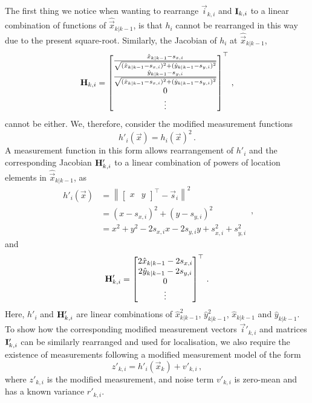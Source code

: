 \documentclass[10pt,letterpaper,oneside,twocolumn,journal]{IEEEtran}
\theoremstyle{definition}
\theoremstyle{definition}
\theoremstyle{remark}
\begin{document}
The first thing we notice when wanting to rearrange $\vec{i}_{k,i}$ and ${{\mathbf{I}}}_{k,i}$ to a linear combination of functions of $\hat{\vec{x}}_{k|k-1}$, is that $h_i$ cannot be rearranged in this way due to the present square-root. Similarly, the Jacobian of $h_i$ at $\hat{\vec{x}}_{k|k-1}$,
\begin{equation}
    {\ensuremath{{\mathbf{H}}}}_{k,i} = 
    \begin{bmatrix}
        \frac{\hat{x}_{k|k-1} - s_{x,i}}{\sqrt{(\hat{x}_{k|k-1} - s_{x,i})^2 + (\hat{y}_{k|k-1} - s_{y,i})^2}} \\
        \frac{\hat{y}_{k|k-1} - s_{y,i}}{\sqrt{(\hat{x}_{k|k-1} - s_{x,i})^2 + (\hat{y}_{k|k-1} - s_{y,i})^2}} \\
        0 \\
        \vdots
    \end{bmatrix}^\top\,,
\end{equation}
cannot be either. We, therefore, consider the modified measurement functions
\begin{equation}
    h'_i(\vec{x}) = h_i(\vec{x})^2\,. \label{eqn:modified_measurement_func}
\end{equation}
A measurement function in this form allows rearrangement of $h'_i$ and the corresponding Jacobian ${{\mathbf{H}}}'_{k,i}$ to a linear combination of powers of location elements in $\hat{\vec{x}}_{k|k-1}$, as
\begin{equation}
    \begin{split}
        h'_i(\vec{x}) &= \left\lVert
        \begin{bmatrix}
            x & y
        \end{bmatrix}^\top - \vec{s}_i\right\rVert^2 \\
        &= (x - s_{x,i})^2 + (y - s_{y,i})^2 \\
        &= x^2 + y^2 -2s_{x,i}x -2s_{y,i}y +s_{x,i}^2 +s_{y,i}^2
    \end{split}\,,
\end{equation}
and
\begin{equation}
    \mat{H}'_{k,i} = 
    \begin{bmatrix}
        2\hat{x}_{k|k-1} - 2s_{x,i} \\
        2\hat{y}_{k|k-1} - 2s_{y,i} \\
        0 \\
        \vdots
    \end{bmatrix}^\top\,. \label{eqn:modified_jacobian}
\end{equation}
Here, $h'_i$ and ${{\mathbf{H}}}'_{k,i}$ are linear combinations of $\hat{x}_{k|k-1}^2$, $\hat{y}_{k|k-1}^2$, $\hat{x}_{k|k-1}$ and $\hat{y}_{k|k-1}$. To show how the corresponding modified measurement vectors $\vec{i}'_{k,i}$ and matrices ${{\mathbf{I}}}'_{k,i}$ can be similarly rearranged and used for localisation, we also require the existence of measurements following a modified measurement model of the form
\begin{equation}
    z'_{k,i} = h'_i(\vec{x}_k)+v'_{k,i}\,, \label{eqn:modified_measurement_model}
\end{equation}
where $z'_{k,i}$ is the modified measurement, and noise term $v'_{k,i}$ is zero-mean and has a known variance $r'_{k,i}$.
\end{document}

